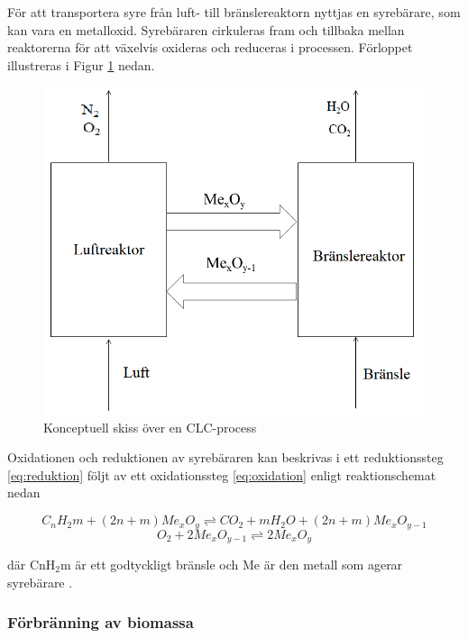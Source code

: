För att transportera syre från luft- till bränslereaktorn nyttjas en syrebärare, som kan vara en metalloxid. Syrebäraren cirkuleras fram och tillbaka mellan reaktorerna för att växelvis oxideras och reduceras i processen. Förloppet illustreras i Figur \ref{fig:CLC} nedan.


\begin{figure}[H]
    \centering
    \includegraphics[scale=0.6]{CLC.png}
    \caption{Konceptuell skiss över en CLC-process}
    \label{fig:CLC}
\end{figure}

Oxidationen och reduktionen av syrebäraren kan beskrivas i ett reduktionssteg \eqref{eq:reduktion} följt av ett oxidationssteg \eqref{eq:oxidation} enligt reaktionschemat nedan

\begin{equation}
C_nH_2m+(2n+m)Me_xO_y \rightleftharpoons  CO_2+mH_2O+(2n+m)Me_xO_{y-1}
   \label{eq:reduktion}
\end{equation}
\begin{equation}
    O_2 + 2Me_xO_{y-1} \rightleftharpoons  2Me_xO_y
    \label{eq:oxidation}
\end{equation}

där CnH$_2$m är ett godtyckligt bränsle och Me är den metall som agerar syrebärare \cite{OresHenrik}.




\subsubsection{Förbränning av biomassa}




